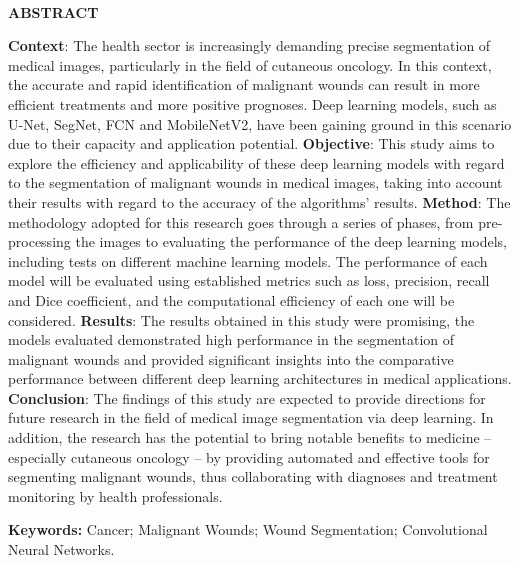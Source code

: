 \begin{center}
    \textbf{\\ABSTRACT \\ }
\end{center}

\textbf{Context}: The health sector is increasingly demanding precise segmentation of medical images, particularly in the field of cutaneous oncology. In this context, the accurate and rapid identification of malignant wounds can result in more efficient treatments and more positive prognoses. Deep learning models, such as \acf{U-Net}, \acf{SegNet}, \acf{FCN} and \acf{MobileNetV2}, have been gaining ground in this scenario due to their capacity and application potential. \textbf{Objective}: This study aims to explore the efficiency and applicability of these deep learning models with regard to the segmentation of malignant wounds in medical images, taking into account their results with regard to the accuracy of the algorithms' results. \textbf{Method}: The methodology adopted for this research goes through a series of phases, from pre-processing the images to evaluating the performance of the deep learning models, including tests on different machine learning models. The performance of each model will be evaluated using established metrics such as loss, precision, recall and Dice coefficient, and the computational efficiency of each one will be considered. \textbf{Results}: The results obtained in this study were promising, the models evaluated demonstrated high performance in the segmentation of malignant wounds and provided significant insights into the comparative performance between different deep learning architectures in medical applications. \textbf{Conclusion}: The findings of this study are expected to provide directions for future research in the field of medical image segmentation via deep learning. In addition, the research has the potential to bring notable benefits to medicine -- especially cutaneous oncology -- by providing automated and effective tools for segmenting malignant wounds, thus collaborating with diagnoses and treatment monitoring by health professionals.

\textbf{Keywords:} Cancer; Malignant Wounds; Wound Segmentation; Convolutional Neural Networks.